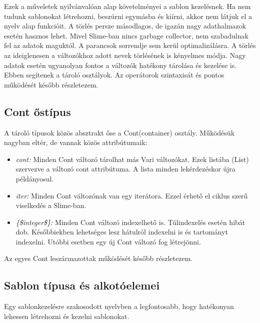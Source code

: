 Ezek a műveletek nyilvánvalóan alap követelményei a sablon kezelésnek. 
Ha nem tudunk sablonokat létrehozni, beszúrni egymásba és kiírni, akkor nem látjuk el a nyelv alap funkcióit.
A törlés persze másodlagos, de igazán nagy adathalmazok esetén hasznos lehet. 
Mivel Slime-ban nincs garbage collector, nem szabadulnak fel az adatok maguktól.
A parancsok sorrendje sem kerül optimalizálásra.
A törlés az ideiglenesen a változókhoz adott nevek törlésének is kényelmes módja.
Nagy adatok esetén ugyanolyan fontos a változók hatékony tárolása és kezelése is.
Ebben segítenek a tároló osztályok.
Az operátorok szintaxisát és pontos működését később részletezem. 


\subsection{Cont őstípus}
\label{sec:SContSuper}
A tároló típusok közös absztrakt őse a Cont(container) osztály.
Működésük nagyban eltér, de vannak közös attribútumaik:
\begin{itemize}
\item \emph{cont:} 
Minden Cont változó tárolhat más Vari változókat.
Ezek listába (List) szervezve a változó cont attribútuma.
A lista minden lekérdezéskor újra példányosul.
\item \emph{iter:} 
Minden Cont változónak van egy iterátora.
Ezzel érhető el ciklus szerű viselkedés a Slime-ban.
\item \emph{\{\$integer\$\}:} 
Minden Cont változó indexelhető is.
Túlindexelés esetén hibát dob.
Későbbiekben lehetséges lesz hátulról indexelni is és tartományt indexelni.
Utóbbi esetben egy új Cont változó fog létrejönni.
\end{itemize}

Az egyes Cont leszármazottak működését később részletezem.

\subsection{Sablon típusa és alkotóelemei}
\label{sec:STemp}
Egy sablonkezelésre szakosodott nyelvben a legfontosabb, hogy hatékonyan lehessen létrehozni és kezelni sablonokat.


